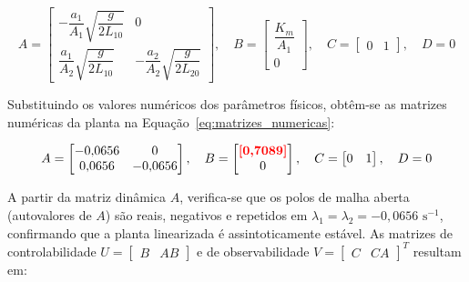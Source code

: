 \documentclass[a4paper,12pt]{article}
\newcommand{\dado}[1]{\textcolor{red}{\textbf{[#1]}}}
\newcommand{\dado}[1]{#1}
\begin{document}
\begin{equation}
    A = \begin{bmatrix} -\dfrac{a_1}{A_1}\sqrt{\dfrac{g}{2 L_{10}}} & 0 \\[1.2em] \dfrac{a_1}{A_2}\sqrt{\dfrac{g}{2 L_{10}}} & -\dfrac{a_2}{A_2}\sqrt{\dfrac{g}{2 L_{20}}} \end{bmatrix}, \quad
    B = \begin{bmatrix} \dfrac{K_m}{A_1} \\[1.2em] 0 \end{bmatrix}, \quad
    C = \begin{bmatrix} 0 & 1 \end{bmatrix}, \quad
    D = 0
    \label{eq:matrizes_literais}
\end{equation}

\begin{justify}
    \hspace{4ex}Substituindo os valores numéricos dos parâmetros físicos, obtêm-se as matrizes numéricas da planta na Equação~\eqref{eq:matrizes_numericas}:
\end{justify}

\begin{equation}
    A = \begin{bmatrix} -0{,}0656 & 0 \\ 0{,}0656 & -0{,}0656 \end{bmatrix}, \quad
    B = \begin{bmatrix} \dado{0{,}7089} \\ 0 \end{bmatrix}, \quad
    C = \begin{bmatrix} 0 & 1 \end{bmatrix}, \quad
    D = 0
    \label{eq:matrizes_numericas}
\end{equation}

\begin{justify}
    \hspace{4ex}A partir da matriz dinâmica $A$, verifica-se que os polos de malha aberta (autovalores de $A$) são reais, negativos e repetidos em $\lambda_1 = \lambda_2 = -0{,}0656\text{ s}^{-1}$, confirmando que a planta linearizada é assintoticamente estável. As matrizes de controlabilidade $U = \begin{bmatrix} B & AB \end{bmatrix}$ e de observabilidade $V = \begin{bmatrix} C & CA \end{bmatrix}^T$ resultam em:
\end{justify}
\end{document}
